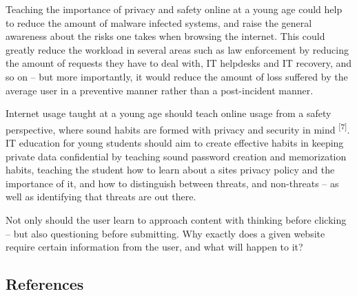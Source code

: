\documentclass[twocolumn,letterpaper]{article}
\begin{document}
Teaching the importance of privacy and safety online at a young age could help to reduce the amount of malware infected
systems, and raise the general awareness about the risks one takes when browsing the internet. This could greatly
reduce the workload in several areas such as law enforcement by reducing the amount of requests they have to deal with,
IT helpdesks and IT recovery, and so on – but more importantly, it would reduce the amount of loss suffered by the
average user in a preventive manner rather than a post-incident manner.

Internet usage taught at a young age should teach online usage from a safety perspective, where sound habits are formed
with privacy and security in mind \textsuperscript{[7]}. IT education for young students should aim to create effective
habits in keeping private data confidential by teaching sound password creation and memorization habits, teaching the
student how to learn about a sites privacy policy and the importance of it, and how to distinguish between threats, and
non-threats – as well as identifying that threats are out there. 

Not only should the user learn to approach content with thinking before clicking – but also questioning before
submitting. Why exactly does a given website require certain information from the user, and what will happen to it? 

\subsection[References]{\textmd{\textup{References}}}

\bigskip


\bigskip
\end{document}
